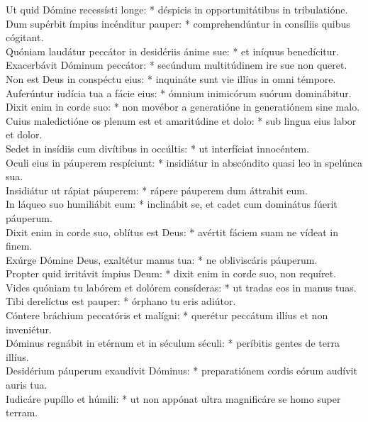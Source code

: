 {	Ut quid Dómine recessísti longe: * déspicis in opportunitátibus in tribulatióne. \\
	Dum supérbit ímpius incénditur pauper: * comprehendúntur in consíliis quibus cógitant. \\
	Quóniam laudátur peccátor in desidériis ánime sue: * et iníquus benedícitur. \\
	Exacerbávit Dóminum peccátor: * secúndum multitúdinem ire sue non queret. \\
	Non est Deus in conspéctu eius: * inquináte sunt vie illíus in omni témpore. \\
	Auferúntur iudícia tua a fácie eius: * ómnium inimicórum suórum dominábitur. \\
	Dixit enim in corde suo: * non movébor a generatióne in generatiónem sine malo. \\
	Cuius maledictióne os plenum est et amaritúdine et dolo: * sub lingua eius labor et dolor. \\
	Sedet in insídiis cum divítibus in occúltis: * ut interfíciat innocéntem. \\
	Oculi eius in páuperem respíciunt: * insidiátur in abscóndito quasi leo in spelúnca sua. \\
	Insidiátur ut rápiat páuperem: * rápere páuperem dum áttrahit eum. \\
	In láqueo suo humiliábit eum: * inclinábit se, et cadet cum dominátus fúerit páuperum. \\
	Dixit enim in corde suo, oblítus est Deus: * avértit fáciem suam ne vídeat in finem. \\
	Exúrge Dómine Deus, exaltétur manus tua: * ne obliviscáris páuperum. \\
	Propter quid irritávit ímpius Deum: * dixit enim in corde suo, non requíret. \\
	Vides quóniam tu labórem et dolórem consíderas: * ut tradas eos in manus tuas. \\
	Tibi derelíctus est pauper: * órphano tu eris adiútor. \\
	Cóntere bráchium peccatóris et malígni: * querétur peccátum illíus et non inveniétur. \\
	Dóminus regnábit in etérnum et in séculum séculi: * períbitis gentes de terra illíus. \\
	Desidérium páuperum exaudívit Dóminus: * preparatiónem cordis eórum audívit auris tua. \\
	Iudicáre pupíllo et húmili: * ut non appónat ultra magnificáre se homo super terram.
}

